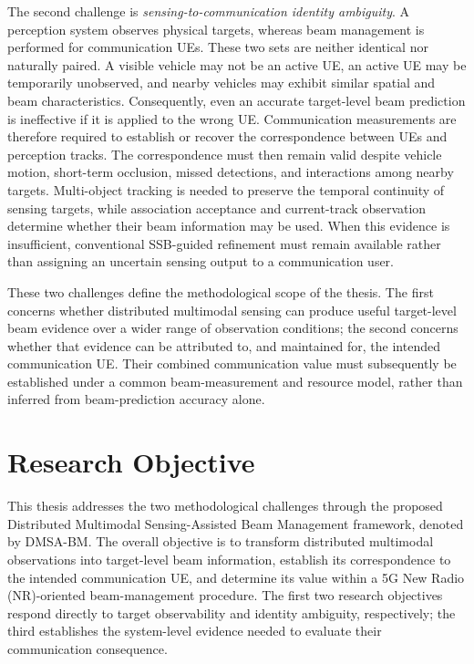 The second challenge is \emph{sensing-to-communication identity ambiguity}.
A perception system observes physical targets, whereas beam management is
performed for communication UEs.  These two sets are neither identical nor
naturally paired.  A visible vehicle may not be an active UE, an active UE may
be temporarily unobserved, and nearby vehicles may exhibit similar spatial and
beam characteristics.  Consequently, even an accurate target-level beam
prediction is ineffective if it is applied to the wrong UE.  Communication
measurements are therefore required to establish or recover the correspondence
between UEs and perception tracks.  The correspondence must then remain valid
despite vehicle motion, short-term occlusion, missed detections, and interactions
among nearby targets.  Multi-object tracking is needed to preserve the temporal
continuity of sensing targets, while association acceptance and current-track
observation determine whether their beam information may be used.  When this
evidence is insufficient, conventional SSB-guided refinement must remain
available rather than assigning an uncertain sensing output to a communication
user.

These two challenges define the methodological scope of the thesis.  The first
concerns whether distributed multimodal sensing can produce useful target-level
beam evidence over a wider range of observation conditions; the second concerns
whether that evidence can be attributed to, and maintained for, the intended
communication UE.  Their combined communication value must subsequently be
established under a common beam-measurement and resource model, rather than
inferred from beam-prediction accuracy alone.

\section{Research Objective}
\label{sec:introduction-objective}

This thesis addresses the two methodological challenges through the proposed
Distributed Multimodal Sensing-Assisted Beam Management framework, denoted by
DMSA-BM.  The overall objective is to transform distributed multimodal
observations into target-level beam information, establish its correspondence
to the intended communication UE, and determine its value within a 5G New Radio
(NR)-oriented beam-management procedure.  The first two research objectives
respond directly to target observability and identity ambiguity, respectively;
the third establishes the system-level evidence needed to evaluate their
communication consequence.

